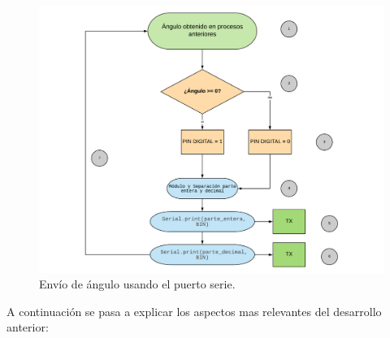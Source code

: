 \begin{figure}[H]
	\center
	\includegraphics[trim = 0mm 0mm 0mm 0mm, clip,scale=0.6]{imagenes/Balancing_robot/extraccion_angulo.pdf}
	\caption{Envío de ángulo usando el puerto serie.}
	\label{fig:extraccion_angulo}
\end{figure}


A continuación se pasa a explicar los aspectos mas relevantes del desarrollo anterior: 

